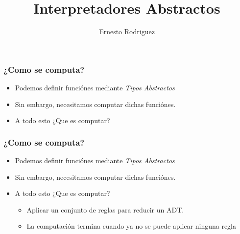 \documentclass{beamer}
\title[Interpretadores]{Interpretadores Abstractos}
\author{Ernesto Rodriguez}
\institute{
    Universidad del Itsmo \\
    \medskip \textit{erodriguez@unis.edu.gt}
}
\date[\today]{}
\begin{document}
\begin{frame}
    \maketitle
\end{frame}

\begin{frame}
    \frametitle{¿Como se computa?}
    \begin{itemize}
    \item{Podemos definir funci\'ones mediante \emph{Tipos Abstractos}}
    \item{Sin embargo, necesitamos computar dichas funci\'ones.}
    \item{A todo esto ¿Que es computar?}
    \end{itemize}
\end{frame}

\begin{frame}
    \frametitle{¿Como se computa?}
    \begin{itemize}
    \item{Podemos definir funci\'ones mediante \emph{Tipos Abstractos}}
    \item{Sin embargo, necesitamos computar dichas funci\'ones.}
    \item{A todo esto ¿Que es computar?
    \begin{itemize}
        \item{Aplicar un conjunto de reglas para reducir un ADT.}
        \item{La computaci\'on termina cuando ya no se puede aplicar ninguna regla}
    \end{itemize}
    }
    \end{itemize}
\end{frame}
\end{document}

